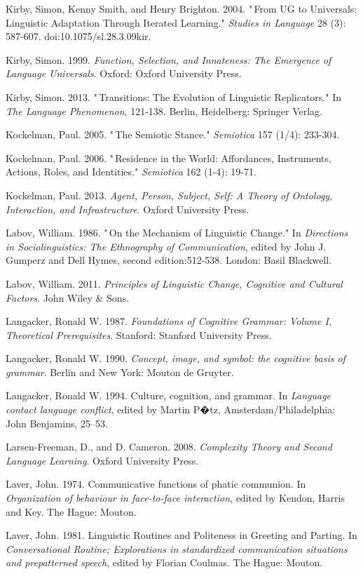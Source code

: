 Kirby, Simon, Kenny Smith, and Henry Brighton. 2004. "\,From UG to 
Universals: Linguistic Adaptation Through Iterated Learning." \textit{
Studies in Language} 28 (3): 587-607. doi:10.1075/sl.28.3.09kir.

Kirby, Simon. 1999. \textit{Function, Selection, and Innateness: The 
Emergence of Language Universals}. Oxford: Oxford University Press.

Kirby, Simon. 2013. "\,Transitions: The Evolution of Linguistic 
Replicators." In \textit{The Language Phenomenon}, 121-138. Berlin, 
Heidelberg: Springer Verlag.

Kockelman, Paul. 2005. "\,The Semiotic Stance." \textit{Semiotica} 157 
(1/4): 233-304.

Kockelman, Paul. 2006. "\,Residence in the World: Affordances, 
Instruments, Actions, Roles, and Identities." \textit{Semiotica} 162 
(1-4): 19-71.

Kockelman, Paul. 2013. \textit{Agent, Person, Subject, Self: A Theory 
of Ontology, Interaction, and Infrastructure}. Oxford University 
Press.

Labov, William. 1986. "\,On the Mechanism of Linguistic Change." In 
\textit{Directions in Sociolinguistics: The Ethnography of 
Communication}, edited by John J. Gumperz and Dell Hymes, second 
edition:512-538. London: Basil Blackwell.

Labov, William. 2011. \textit{Principles of Linguistic Change, 
Cognitive and Cultural Factors}. John Wiley \& Sons.

Langacker, Ronald W. 1987. \textit{Foundations of Cognitive Grammar: 
Volume I, Theoretical Prerequisites}. Stanford: Stanford University 
Press.

Langacker, Ronald W. 1990. \textit{Concept, image, and symbol: the 
cognitive basis of grammar}. Berlin and New York: Mouton de Gruyter.

Langacker, Ronald W. 1994. Culture, cognition, and grammar. In \textit{
Language contact language conflict}, edited by Martin P�tz, 
Amsterdam/Philadelphia: John Benjamins, 25--53.

Larsen-Freeman, D., and D. Cameron. 2008. \textit{Complexity Theory and 
Second Language Learning}. Oxford University Press.

Laver, John. 1974. Communicative functions of phatic communion. In 
\textit{Organization of behaviour in face-to-face interaction}, 
edited by Kendon, Harris and Key. The Hague: Mouton.

Laver, John. 1981. Linguistic Routines and Politeness in Greeting and 
Parting. In \textit{Conversational Routine; Explorations in 
standardized communication situations and prepatterned speech}, edited 
by Florian Coulmas. The Hague: Mouton.

